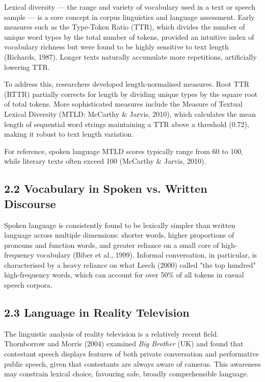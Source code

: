 \documentclass[11pt]{article}
\begin{document}
Lexical diversity --- the range and variety of vocabulary used in a text or speech sample --- is a core concept in corpus linguistics and language assessment. Early measures such as the Type-Token Ratio (TTR), which divides the number of unique word types by the total number of tokens, provided an intuitive index of vocabulary richness but were found to be highly sensitive to text length (Richards, 1987). Longer texts naturally accumulate more repetitions, artificially lowering TTR.

To address this, researchers developed length-normalised measures. Root TTR (RTTR) partially corrects for length by dividing unique types by the square root of total tokens. More sophisticated measures include the Measure of Textual Lexical Diversity (MTLD; McCarthy \& Jarvis, 2010), which calculates the mean length of sequential word strings maintaining a TTR above a threshold (0.72), making it robust to text length variation.

For reference, spoken language MTLD scores typically range from 60 to 100, while literary texts often exceed 100 (McCarthy \& Jarvis, 2010).

\subsection*{2.2 Vocabulary in Spoken vs. Written Discourse}

Spoken language is consistently found to be lexically simpler than written language across multiple dimensions: shorter words, higher proportions of pronouns and function words, and greater reliance on a small core of high-frequency vocabulary (Biber et al., 1999). Informal conversation, in particular, is characterised by a heavy reliance on what Leech (2000) called "the top hundred" high-frequency words, which can account for over 50\% of all tokens in casual speech corpora.

\subsection*{2.3 Language in Reality Television}

The linguistic analysis of reality television is a relatively recent field. Thornborrow and Morris (2004) examined \emph{Big Brother} (UK) and found that contestant speech displays features of both private conversation and performative public speech, given that contestants are always aware of cameras. This awareness may constrain lexical choice, favouring safe, broadly comprehensible language.
\end{document}
